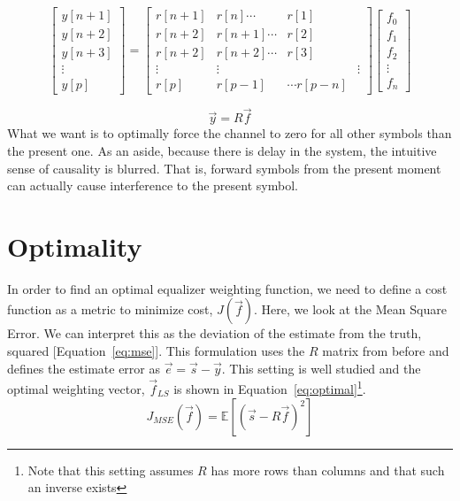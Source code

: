 \documentclass[]{article}
\begin{document}
\begin{equation}
\label{eq:equalizerVector}
\left[ \begin{array}{c}
 y \left[n+1\right] \\
 y \left[n+2\right] \\
 y \left[n+3\right] \\
\vdots  \\
y\left[ p \right] \end{array} \right] = 
\begin{bmatrix} 
r \left[ n+1\right]  & r[n] \cdots & r\left[ 1 \right] \\ 
r \left[ n+2\right]  & r[n+1] \cdots & r\left[ 2 \right] \\ 
r \left[ n+2\right]  & r[n+2] \cdots & r\left[ 3 \right] \\ 
\vdots & \vdots & & \vdots \\
r \left[p \right] & r\left[ p-1 \right] & \cdots r\left[ p-n \right]
\end{bmatrix}
 \left[ \begin{array}{c} f_0 \\ f_1 \\ f_2 \\ \vdots \\ f_n \end{array} \right]
\end{equation}

\begin{equation}
\label{eq:equalizerMatrix}
\vec{y} = R\vec{f}
\end{equation}
What we want is to optimally force the channel to zero for all other symbols than the present one.  As an aside, because there is delay in the system, the intuitive sense of causality is blurred. That is, forward symbols from the present moment can actually cause interference to the present symbol.   \\

\section{Optimality}
\label{sec:optimal}
In order to find an optimal equalizer weighting function, we need to define a cost function as a metric to minimize cost, $J(\vec{f})$.  Here, we look at the Mean Square Error.  We can interpret this as the deviation of the estimate from the truth, squared [Equation~\ref{eq:mse}].  This formulation uses the $R$ matrix from before and defines the estimate error as $\vec{e} = \vec{s} - \vec{y}$.  This setting is well studied and the optimal weighting vector, $\vec{f}_{LS}$ is shown in Equation~\ref{eq:optimal}\footnote{Note that this setting assumes $R$ has more rows than columns and that such an inverse exists}.
\begin{equation}
\label{eq:mse} 
J_{MSE} \left( \vec{f}\right) = \mathbb{E} \left[ \left(\vec{s} - R \vec{f} \right)^2 \right]
\end{equation}
\end{document}
